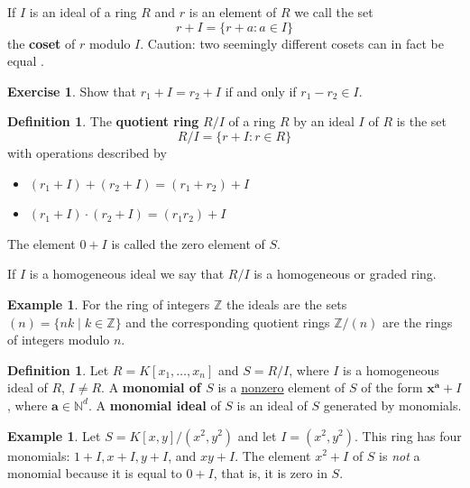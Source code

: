 \documentclass[11pt]{amsart}
\newcommand{\m}{{\mathfrak M}}
\newcommand{\N}{{\mathbb N}}
\newcommand{\Z}{{\mathbb Z}}
\newcommand{\ba}{{\mathbf a}}
\newcommand{\bx}{{\mathbf x}}
\theoremstyle{plain} %
\theoremstyle{definition}
\newtheorem{defn}[thm]{Definition}
\newtheorem{ex}[thm]{Example}
\newtheorem{exer}[thm]{Exercise}
\theoremstyle{remark}
\numberwithin{equation}{section}  %
\begin{document}
If $I$ is an ideal of a ring $R$ and $r$ is an element of $R$ we call the set
\[
r+I=\{ r+a : a\in I\}
\]
the {\bf coset} of $r$ modulo $I$.
Caution: two seemingly different cosets can in fact be equal .
\begin{tcolorbox}[reset]
\begin{exer}
Show that $r_1+I=r_2+I$ if and only if $r_1-r_2\in I$.
\end{exer}
\end{tcolorbox}
\begin{tcolorbox}
\begin{defn} The  {\bf quotient ring} $R/I$ of a ring $R$ by an ideal $I$ of $R$ is  the set 
\[
R/I=\{r+I : r\in R\}
\]
with operations described  by
\begin{itemize}
\item $(r_1+I)+(r_2+I)=(r_1+r_2)+I$ 
\item $(r_1+I)\cdot (r_2+I)=(r_1r_2)+I$
\end{itemize}
The element $0+I$ is called the zero element of $S$.

If $I$ is a homogeneous ideal we say that $R/I$ is a homogeneous or graded ring.
\end{defn}
\end{tcolorbox}

\begin{ex}
For the ring of integers $\Z$ the ideals are the sets $(n)=\{nk \mid k\in \Z\}$ and the corresponding quotient rings $\Z/(n)$ are the rings of integers modulo $n$.
\end{ex}

\begin{tcolorbox}
\begin{defn}\label{Monomials_and_Monomial_Ideals_Definition}
 Let $R=K[x_1,\dots, x_n]$ and $S=R/I$, where $I$ is a homogeneous ideal of $R$,  $I\neq R$. 
A {\bf monomial of $S$} is a \underline{nonzero} element of $S$ of the form $\bx^\ba + I$, where $\ba \in \N^d$.
A {\bf monomial ideal} of $S$ is an ideal of $S$  generated by monomials.
	\end{defn}
	\end{tcolorbox}

\begin{ex}
Let $S=K[x,y]/(x^2,y^2)$ and let $I=(x^2,y^2)$. This ring has four monomials: $1+I, x+I, y+I$, and $xy+I$. The element $x^2+I$ of $S$ is {\em not} a monomial because it is equal to $0+I$, that is, it is zero in $S$.
\end{ex}
\end{document}
